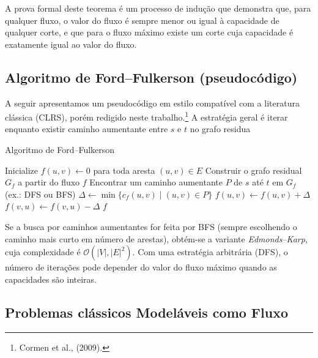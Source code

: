 \documentclass[12pt]{article}
\begin{document}
\noindent A prova formal deste teorema é um processo de indução que demonstra que, para qualquer fluxo, o valor do fluxo é sempre menor ou igual à capacidade de qualquer corte, e que para o fluxo máximo existe um corte cuja capacidade é exatamente igual ao valor do fluxo.

\newpage
\subsection{Algoritmo de Ford–Fulkerson (pseudocódigo)} 

A seguir apresentamos um pseudocódigo em estilo compatível com a literatura clássica (CLRS), porém redigido neste trabalho.\footnote{Cormen et al., (2009).} A estratégia geral é iterar enquanto existir caminho aumentante entre $s$ e $t$ no grafo residua

\begin{algorithm}[H]
\caption{Algoritmo de Ford–Fulkerson}
\label{alg:ford_fulkerson}
\begin{algorithmic}[1]
    \State Inicialize $f(u,v) \gets 0$ para toda aresta $(u,v) \in E$
        \State Construir o grafo residual $G_f$ a partir do fluxo $f$
        \State Encontrar um caminho aumentante $P$ de $s$ até $t$ em $G_f$ (ex.: DFS ou BFS)
        \State $\Delta \gets \min\{c_f(u,v) \mid (u,v) \in P\}$ 
            \State $f(u,v) \gets f(u,v) + \Delta$ 
            \State $f(v,u) \gets f(v,u) - \Delta$ 
        \EndFor
    \EndWhile
    \State \Return $f$ 
\EndProcedure
\end{algorithmic}
\end{algorithm}



\noindent Se a busca por caminhos aumentantes for feita por BFS (sempre escolhendo o caminho mais curto em número de arestas), obtém-se a variante \emph{Edmonds–Karp}, cuja complexidade é $\mathcal{O}(|V|,|E|^2)$. Com uma estratégia arbitrária (DFS), o número de iterações pode depender do valor do fluxo máximo quando as capacidades são inteiras.


\subsection{Problemas clássicos Modeláveis como Fluxo} 
\end{document}
